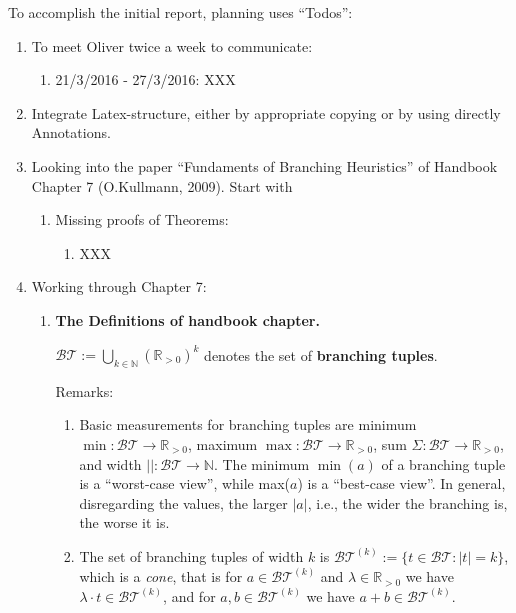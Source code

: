 \documentclass{report}
\begin{document}
	
	To accomplish the initial report, planning uses ``Todos'':
	\begin{enumerate}
		\item To meet Oliver twice a week to communicate:
		\begin{enumerate}[Week 1]
			\item 21/3/2016 - 27/3/2016: XXX
		\end{enumerate}
		\item Integrate Latex-structure, either by appropriate copying or by using directly Annotations.
		\item Looking into the paper ``Fundaments of Branching Heuristics'' of Handbook Chapter 7 (O.Kullmann, 2009). Start with
		\begin{enumerate}
			\item Missing proofs of Theorems:
			\begin{enumerate}
				\item XXX
			\end{enumerate}
		\end{enumerate}
		\item Working through Chapter 7:
		\begin{enumerate}
			\item {\bf The Definitions of handbook chapter.}
			
			{ $\mathcal{BT} :=\bigcup_{k\in \mathbb{N}}(\mathbb{R}_{>0})^k$}
			denotes the set of {\bf branching tuples}.
			
			Remarks:
			
			\begin{enumerate}
				\item  Basic measurements for branching tuples are minimum $\min: \mathcal{BT} \to \mathbb{R}_{>0}$,
				maximum $\max : \mathcal{BT} \to \mathbb{R}_{>0}$, sum $\Sigma : \mathcal{BT} \to \mathbb{R}_{>0}$, and width $|| : \mathcal{BT} \to \mathbb{N}$.
				The minimum $\min(a)$ of a branching tuple is a ``worst-case view'', while
				max($a$) is a ``best-case view''. In general, disregarding the values, the
				larger $|a|$, i.e., the wider the branching is, the worse it is.
				
				\item The set of branching tuples of width $k$ is ${\mathcal{BT}}^{{(k)}}:= \{t \in \mathcal{BT} : |t| = k\}$,
				which is a {\it cone}, that is for $a \in \mathcal{BT}^{(k)}$ and $\lambda \in \mathbb{R}_{>0}$ we have $\lambda \cdot t \in \mathcal{BT}^{(k)} $, and for $a,b \in \mathcal{BT}^{(k)}$ we have $a + b \in \mathcal{BT}^{(k)}$.
				

\end{enumerate}
\end{enumerate}
\end{enumerate}
\end{document}
